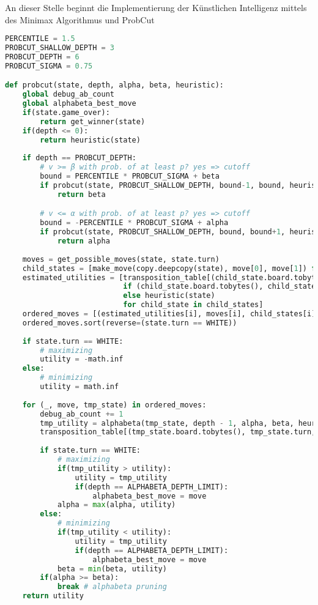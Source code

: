 An dieser Stelle beginnt die Implementierung der Künstlichen Intelligenz
mittels des Minimax Algorithmus und ProbCut
\begin{lstlisting}[language=Python]
PERCENTILE = 1.5
PROBCUT_SHALLOW_DEPTH = 3
PROBCUT_DEPTH = 6
PROBCUT_SIGMA = 0.75

def probcut(state, depth, alpha, beta, heuristic):
    global debug_ab_count
    global alphabeta_best_move
    if(state.game_over):
        return get_winner(state)
    if(depth <= 0):
        return heuristic(state)
    
    if depth == PROBCUT_DEPTH:
        # v >= β with prob. of at least p? yes => cutoff
        bound = PERCENTILE * PROBCUT_SIGMA + beta
        if probcut(state, PROBCUT_SHALLOW_DEPTH, bound-1, bound, heuristic) >= bound:
            return beta

        # v <= α with prob. of at least p? yes => cutoff
        bound = -PERCENTILE * PROBCUT_SIGMA + alpha
        if probcut(state, PROBCUT_SHALLOW_DEPTH, bound, bound+1, heuristic) <= bound:
            return alpha
    
    moves = get_possible_moves(state, state.turn)
    child_states = [make_move(copy.deepcopy(state), move[0], move[1]) for move in moves]
    estimated_utilities = [transposition_table[(child_state.board.tobytes(), child_state.turn, heuristic)]
                           if (child_state.board.tobytes(), child_state.turn, heuristic) in transposition_table
                           else heuristic(state)
                           for child_state in child_states]
    ordered_moves = [(estimated_utilities[i], moves[i], child_states[i]) for i in range(len(moves))]
    ordered_moves.sort(reverse=(state.turn == WHITE))
    
    if state.turn == WHITE:
        # maximizing
        utility = -math.inf
    else:
        # minimizing
        utility = math.inf
        
    for (_, move, tmp_state) in ordered_moves:
        debug_ab_count += 1
        tmp_utility = alphabeta(tmp_state, depth - 1, alpha, beta, heuristic)
        transposition_table[(tmp_state.board.tobytes(), tmp_state.turn, heuristic)] = tmp_utility
        
        if state.turn == WHITE:
            # maximizing
            if(tmp_utility > utility):
                utility = tmp_utility
                if(depth == ALPHABETA_DEPTH_LIMIT):
                    alphabeta_best_move = move
            alpha = max(alpha, utility)
        else:
            # minimizing
            if(tmp_utility < utility):
                utility = tmp_utility
                if(depth == ALPHABETA_DEPTH_LIMIT):
                    alphabeta_best_move = move
            beta = min(beta, utility)
        if(alpha >= beta):
            break # alphabeta pruning
    return utility
\end{lstlisting}

